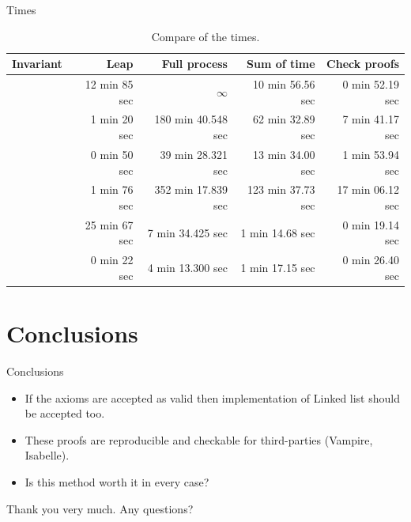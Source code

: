 \documentclass[10pt,notes,compress,usetitleprogressbar,aspectratio=1610]{beamer}
\begin{document}
\begin{frame}{Times}
\begin{table}[hbtp]
\centering
\begin{tabular}{r|rrrr}
Invariant 		& Leap 	& Full process 		& Sum of \spass time 	& Check proofs 	\\\hline
\invPreserve 	& 12 min 85	sec & $\infty$			& 10 min 56.56 sec				& 0 min 52.19 sec		\\
\invOrder		& 1 min 20	sec & 180 min 40.548 sec		& 62 min 32.89 sec				& 7 min 41.17 sec 		\\
\invLock		& 0 min 50	sec & 39 min 28.321 sec			& 13 min 34.00 sec 				& 1 min 53.94 sec		\\
\invNext 		& 1 min 76	sec & 352 min 17.839 sec		& 123 min 37.73 sec				& 17 min 06.12 sec		\\
\invRegion		& 25 min 67	sec & 7 min 34.425 sec			& 1 min 14.68 sec				& 0 min 19.14 sec		\\
\invDisjoint 	& 0 min 22 	sec & 4 min 13.300 sec 			& 1 min 17.15 sec 				& 0 min 26.40 sec		\\
\end{tabular}
\caption{Compare of the times.}
\label{analysis::bigtimetable}
\end{table}
\end{frame}



\section{Conclusions}
\begin{frame}{Conclusions}
\begin{center}
\large
	\begin{itemize}
		\item<1-> If the axioms are accepted as valid then implementation of Linked list should be accepted too.
		\item<2-> These proofs are reproducible and checkable for third-parties (Vampire, Isabelle).
		\item<3-> Is this method worth it in every case?
	\end{itemize}
\end{center}
\end{frame}



\begin{frame}[standout]

\begin{center}
Thank you very much. Any questions?
\end{center}

\end{frame}
\end{document}
